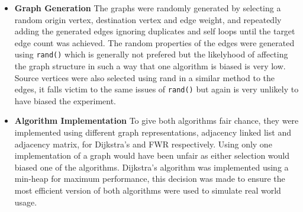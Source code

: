 \documentclass{article}
\begin{document}
\begin{itemize}
    \item \textbf{Graph Generation} The graphs were randomly generated by selecting a random origin vertex, destination vertex and edge weight, and repeatedly adding the generated edges ignoring duplicates and self loops until the target edge count was achieved. The random properties of the edges were generated using \texttt{rand()} which is generally not prefered but the likelyhood of affecting the graph structure in such a way that one algorithm is biased is very low. Source vertices were also selected using rand in a similar method to the edges, it falls victim to the same issues of \texttt{rand()} but again is very unlikely to have biased the experiment. 
    \item \textbf{Algorithm Implementation} To give both algorithms fair chance, they were implemented using different graph representations, adjacency linked list and adjacency matrix, for Dijkstra's and FWR respectively. Using only one implementation of a graph would have been unfair as either selection would biased one of the algorithms. Dijkstra's algorithm was implemented using a min-heap for maximum performance, this decision was made to ensure the most efficient version of both algorithms were used to simulate real world usage. 
\end{itemize}
\end{document}
